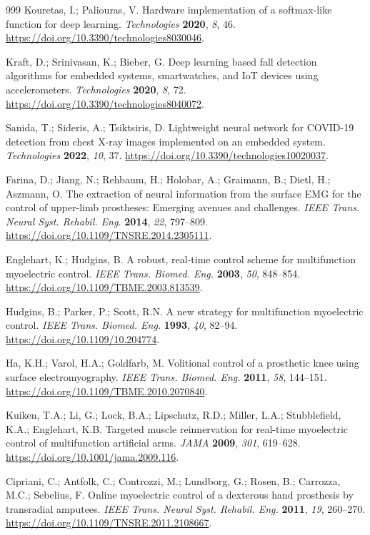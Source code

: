 \documentclass[technologies,article,submit,pdftex,moreauthors]{Definitions/mdpi}
\begin{document}
\begin{thebibliography}{999}
Kouretas, I.; Paliouras, V. Hardware implementation of a softmax-like function for deep learning. \textit{Technologies} \textbf{2020}, \textit{8}, 46. \url{https://doi.org/10.3390/technologies8030046}.

Kraft, D.; Srinivasan, K.; Bieber, G. Deep learning based fall detection algorithms for embedded systems, smartwatches, and IoT devices using accelerometers. \textit{Technologies} \textbf{2020}, \textit{8}, 72. \url{https://doi.org/10.3390/technologies8040072}.

Sanida, T.; Sideris, A.; Tsiktsiris, D. Lightweight neural network for COVID-19 detection from chest X-ray images implemented on an embedded system. \textit{Technologies} \textbf{2022}, \textit{10}, 37. \url{https://doi.org/10.3390/technologies10020037}.

Farina, D.; Jiang, N.; Rehbaum, H.; Holobar, A.; Graimann, B.; Dietl, H.; Aszmann, O. The extraction of neural information from the surface EMG for the control of upper-limb prostheses: Emerging avenues and challenges. \textit{IEEE Trans. Neural Syst. Rehabil. Eng.} \textbf{2014}, \textit{22}, 797--809. \url{https://doi.org/10.1109/TNSRE.2014.2305111}.

Englehart, K.; Hudgins, B. A robust, real-time control scheme for multifunction myoelectric control. \textit{IEEE Trans. Biomed. Eng.} \textbf{2003}, \textit{50}, 848--854. \url{https://doi.org/10.1109/TBME.2003.813539}.

Hudgins, B.; Parker, P.; Scott, R.N. A new strategy for multifunction myoelectric control. \textit{IEEE Trans. Biomed. Eng.} \textbf{1993}, \textit{40}, 82--94. \url{https://doi.org/10.1109/10.204774}.

Ha, K.H.; Varol, H.A.; Goldfarb, M. Volitional control of a prosthetic knee using surface electromyography. \textit{IEEE Trans. Biomed. Eng.} \textbf{2011}, \textit{58}, 144--151. \url{https://doi.org/10.1109/TBME.2010.2070840}.

Kuiken, T.A.; Li, G.; Lock, B.A.; Lipschutz, R.D.; Miller, L.A.; Stubblefield, K.A.; Englehart, K.B. Targeted muscle reinnervation for real-time myoelectric control of multifunction artificial arms. \textit{JAMA} \textbf{2009}, \textit{301}, 619--628. \url{https://doi.org/10.1001/jama.2009.116}.

Cipriani, C.; Antfolk, C.; Controzzi, M.; Lundborg, G.; Rosen, B.; Carrozza, M.C.; Sebelius, F. Online myoelectric control of a dexterous hand prosthesis by transradial amputees. \textit{IEEE Trans. Neural Syst. Rehabil. Eng.} \textbf{2011}, \textit{19}, 260--270. \url{https://doi.org/10.1109/TNSRE.2011.2108667}.


\end{thebibliography}
\end{document}
